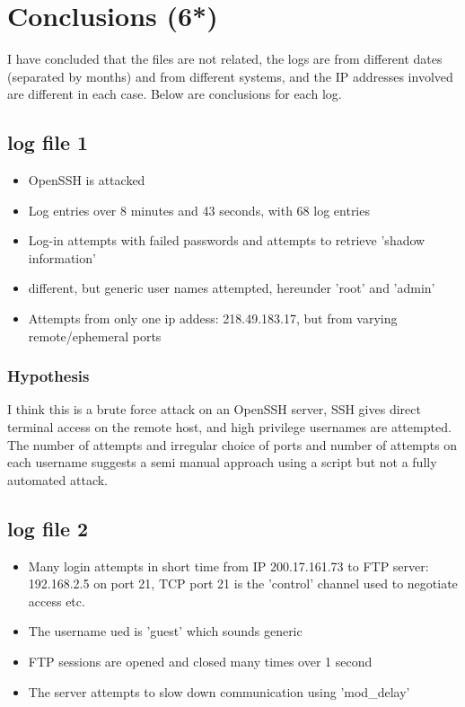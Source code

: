 \documentclass[
	letterpaper, %
	10pt, %
	unnumberedsections, %
	twoside, %
]{APAAssignment}
\begin{document}
\section{Conclusions (6*)}
I have concluded that the files are not related, the logs are from different dates (separated by months) and from different systems, and the IP addresses involved are different in each case. Below are conclusions for each log.



\subsection{log file 1}
\begin{itemize}
  \item OpenSSH is attacked  
  \item Log entries over 8 minutes and 43 seconds, with 68 log entries
  \item Log-in attempts with failed passwords and attempts to retrieve 'shadow information'
  \item different, but generic user names attempted, hereunder 'root' and 'admin'
  \item Attempts from only one ip addess: 218.49.183.17, but from varying remote/ephemeral ports
\end{itemize}

\subsubsection{Hypothesis}
I think this is a brute force attack on an OpenSSH server, SSH gives direct terminal access on the remote host, and high privilege usernames are attempted. The number of attempts and irregular choice of ports and number of attempts on each username suggests a semi manual approach using a script but not a fully automated attack.


\subsection{log file 2}
\begin{itemize}
	\item Many login attempts in short time from IP 200.17.161.73 to FTP server: 192.168.2.5 on port 21, TCP port 21 is the 'control' channel used to negotiate access etc. 
	\item The username ued is 'guest' which sounds generic
	\item FTP sessions are opened and closed many times over 1 second
	\item The server attempts to slow down communication using 'mod\_delay'
\end{itemize}
\end{document}
